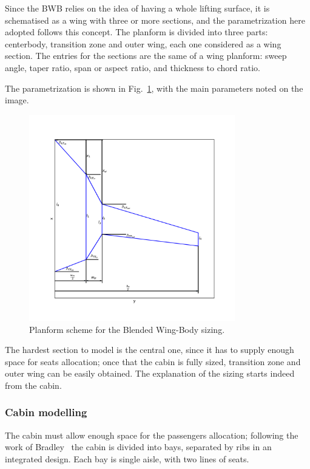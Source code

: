 Since the BWB relies on the idea of having a whole lifting surface, it is schematised as a wing with three or more sections, and the parametrization here adopted follows this concept. 
The planform is divided into three parts: centerbody, transition zone and outer wing, each one considered as a wing section. 
The entries for the sections are the same of a wing planform: sweep angle, taper ratio, span or aspect ratio, and thickness to chord ratio. 

The parametrization is shown in Fig.~\ref{fig:bwb_planform_scheme}, with the main parameters noted on the image. 
\begin{figure}[!h]
	\centering
	\includegraphics[keepaspectratio, width=0.8\textwidth]{images/chap4/bwb_planform_scheme}
	\caption{Planform scheme for the Blended Wing-Body sizing.}
	\label{fig:bwb_planform_scheme}
\end{figure}
The hardest section to model is the central one, since it has to supply enough space for seats allocation; once that the cabin is fully sized, transition zone and outer wing can be easily obtained. 
The explanation of the sizing starts indeed from the cabin.

\subsubsection{Cabin modelling}
\label{subsubsec:chap4_bwb_cabin_model}

The cabin must allow enough space for the passengers allocation; following the work of Bradley~\cite{bib:bradley_bwb} the cabin is divided into bays, separated by ribs in an integrated design. 
Each bay is single aisle, with two lines of seats. 

